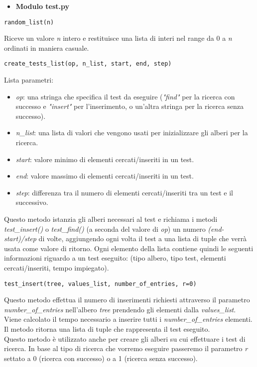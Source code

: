 \documentclass{article}
\begin{document}
\begin{itemize}
    \item \textbf{Modulo test.py}
\end{itemize}
\begin{verbatim}random_list(n)\end{verbatim}
Riceve un valore \emph{n} intero e restituisce una lista di interi nel range da 0 a \emph{n} ordinati in maniera casuale.
\begin{verbatim}create_tests_list(op, n_list, start, end, step)\end{verbatim}
Lista parametri:
\begin{itemize}
    \item \emph{op}: una stringa che specifica il test da eseguire (\emph{"find"} per la ricerca con successo e \emph{"insert"} per l'inserimento, o un'altra stringa per la ricerca senza successo).
    \item \emph{n\_list}: una lista di valori che vengono usati per inizializzare gli alberi per la ricerca.
    \item \emph{start}: valore minimo di elementi cercati/inseriti in un test.
    \item \emph{end}: valore massimo di elementi cercati/inseriti in un test.
    \item \emph{step}: differenza tra il numero di elementi cercati/inseriti tra un test e il successivo.
\end{itemize}
Questo metodo istanzia gli alberi necessari al test e richiama i metodi \emph{test\_insert()} o \emph{test\_find()} (a seconda del valore di \emph{op}) un numero \emph{(end-start)/step} di volte, aggiungendo ogni volta il test a una lista di tuple che verrà usata come valore di ritorno. Ogni elemento della lista contiene quindi le seguenti informazioni riguardo a un test eseguito: (tipo albero, tipo test, elementi cercati/inseriti, tempo impiegato).
\begin{verbatim}test_insert(tree, values_list, number_of_entries, r=0)\end{verbatim}
Questo metodo effettua il numero di inserimenti richiesti attraverso il parametro \emph{number\_of\_entries} nell'albero \emph{tree} prendendo gli elementi dalla \emph{values\_list}. Viene calcolato il tempo necessario a inserire tutti i \emph{number\_of\_entries} elementi. Il metodo ritorna una lista di tuple che rappresenta il test eseguito.\\
Questo metodo è utilizzato anche per creare gli alberi su cui effettuare i test di ricerca. In base al tipo di ricerca che vorremo eseguire passeremo il parametro \emph{r} settato a 0 (ricerca con successo) o a 1 (ricerca senza successo). 
\end{document}
